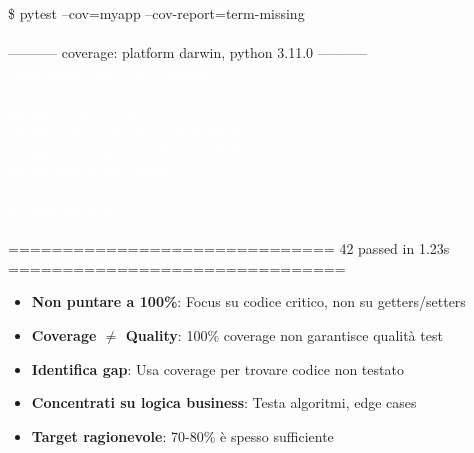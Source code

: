 \begin{tcolorbox}[colback=black!90, coltext=white, fontupper=\ttfamily\footnotesize, title=Terminal: pytest coverage report]
\textcolor{green!80}{\$ pytest --cov=myapp --cov-report=term-missing}\\
\\
\textcolor{cyan!70}{----------- coverage: platform darwin, python 3.11.0 -----------}\\
\textcolor{white}{Name                    Stmts   Miss  Cover   Missing}\\
\textcolor{white}{---------------------------------------------------------}\\
\textcolor{white}{myapp/\_\_init\_\_.py          4      0   \textcolor{green!70}{100\%}}\\
\textcolor{white}{myapp/auth.py            45      8   \textcolor{yellow!70}{82\%}   \textcolor{red!70}{23-25, 67-71}}\\
\textcolor{white}{myapp/models.py          78     12   \textcolor{yellow!70}{85\%}   \textcolor{red!70}{34, 89-99}}\\
\textcolor{white}{myapp/utils.py           23      0   \textcolor{green!70}{100\%}}\\
\textcolor{white}{---------------------------------------------------------}\\
\textcolor{white}{TOTAL                   150     20   \textcolor{green!70}{87\%}}\\
\\
\textcolor{green!70}{============================== 42 passed in 1.23s ===============================}
\end{tcolorbox}

\begin{tcolorbox}[title=Coverage Best Practices]
\begin{itemize}
  \item \textbf{Non puntare a 100\%}: Focus su codice critico, non su getters/setters
  \item \textbf{Coverage $\neq$ Quality}: 100\% coverage non garantisce qualità test
  \item \textbf{Identifica gap}: Usa coverage per trovare codice non testato
  \item \textbf{Concentrati su logica business}: Testa algoritmi, edge cases
  \item \textbf{Target ragionevole}: 70-80\% è spesso sufficiente
\end{itemize}
\end{tcolorbox}

